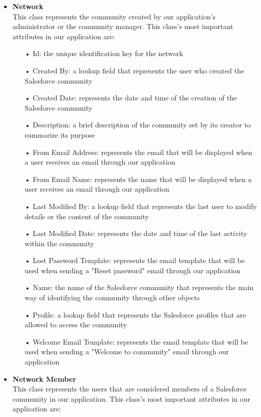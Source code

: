\begin{itemize}
\begin{itemize}
\end{itemize}
\item \textbf{Network}\\
This class represents the community created by our application's administrator or the community manager. This class's most important attributes in our application are:
\begin{itemize}
\item[•] Id: the unique identification key for the network 
\item[•] Created By: a lookup field that represents the user who created the Salesforce community 
\item[•] Created Date: represents the date and time of the creation of the Salesforce community
\item[•] Description: a brief description of the community set by its creator to summarize its purpose
\item[•] From Email Address: represents the email that will be displayed when a user receives an email through our application
\item[•] From Email Name: represents the name that will be displayed when a user receives an email through our application
\item[•] Last Modified By: a lookup field that represents the last user to modify details or the content of the community
\item[•] Last Modified Date: represents the date and time of the last activity within the community
\item[•] Lost Password Template: represents the email template that will be used when sending a "Reset password" email through our application
\item[•] Name: the name of the Salesforce community that represents the main way of identifying the community through other objects
\item[•] Profile: a lookup field that represents the Salesforce profiles that are allowed to access the community
\item[•] Welcome Email Template: represents the email template that will be used when sending a "Welcome to community" email through our application
\end{itemize}
\item \textbf{Network Member}\\
This class represents the users that are considered members of a Salesforce community in our application. This class's most important attributes in our application are:
\begin{itemize}

\end{itemize}
\end{itemize}
